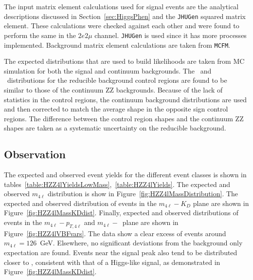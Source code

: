 The input matrix element calculations used for signal events
are the analytical descriptions discussed in 
Section~\ref{sec:HiggsPhen}
and the \verb+JHUGen+ squared matrix element.  These calculations
were checked against each other and were found to perform the 
same in the $2e2\mu$ channel. \verb+JHUGen+ is used
since it has more processes implemented.  Background matrix
element calculations are taken from \verb+MCFM+.

The expected distributions that are used to build likelihoods
are taken from MC simulation for both the signal and continuum
backgrounds.  The \KD~and \spinKD~distributions for the reducible
background control regions are found to be similar to those of the continuum ZZ
backgrounds.  Because of the lack of statistics in the control
regions, the continuum background distributions are used and then
corrected to match the average shape in the opposite sign control 
regions.  The difference between the control region shapes and the
continuum ZZ shapes are taken as a systematic uncertainty on the
reducible background.   

\subsection{Observation}
\label{sec:HZZ4lxsec}

The expected and observed event yields for the different event 
classes is shown in tables~\ref{table:HZZ4lYieldsLowMass},~\ref{table:HZZ4lYields}.  
The expected and observed $m_{4\ell}$ distribution is show in 
Figure~\ref{fig:HZZ4lMassDistribution}.
The expected and observed distribution of 
events in the 
$m_{4\ell}-K_D$ plane are shown in Figure~\ref{fig:HZZ4lMassKDdist}.
Finally, expected and observed distributions of events in the 
$m_{4\ell}-p_{T,4\ell}$ and $m_{4\ell}-$\Djet~plane are 
shown in Figure~\ref{fig:HZZ4lVBFvars}. 
The data show a clear excess of events around $m_{4\ell}=126$~GeV. 
Elsewhere, no significant deviations from the background only expectation are found.  
Events near the signal peak also tend to be distributed closer to 
, consistent with that of a Higgs-like signal, as demonstrated
in Figure~\ref{fig:HZZ4lMassKDdist}. 

